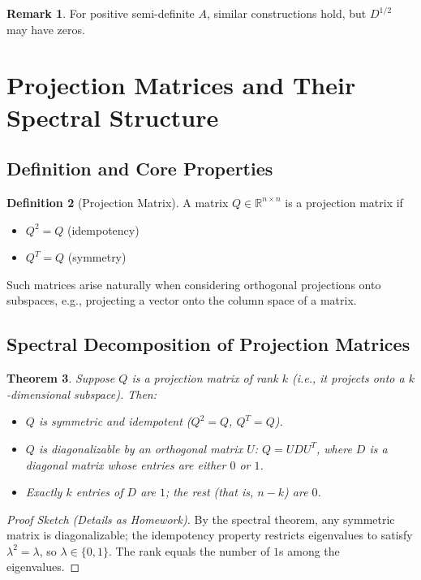 \documentclass[11pt]{article}
\theoremstyle{definition}
\newtheorem{definition}{Definition}[section]
\theoremstyle{plain}
\newtheorem{theorem}[definition]{Theorem}
\theoremstyle{definition}
\newtheorem{remark}[definition]{Remark}
\begin{document}
\begin{remark}
For positive semi-definite $A$, similar constructions hold, but $D^{1/2}$ may have zeros.
\end{remark}

\section{Projection Matrices and Their Spectral Structure}

\subsection{Definition and Core Properties}

\begin{definition}[Projection Matrix]
A matrix $Q \in \mathbb{R}^{n \times n}$ is a projection matrix if
\begin{itemize}
    \item $Q^2 = Q$ \hfill (idempotency)
    \item $Q^T = Q$ \hfill (symmetry)
\end{itemize}
\end{definition}

Such matrices arise naturally when considering orthogonal projections onto subspaces, e.g., projecting a vector onto the column space of a matrix.

\subsection{Spectral Decomposition of Projection Matrices}

\begin{theorem}
Suppose $Q$ is a projection matrix of rank $k$ (i.e., it projects onto a $k$-dimensional subspace). Then:
\begin{itemize}
    \item $Q$ is symmetric and idempotent ($Q^2 = Q$, $Q^T = Q$).
    \item $Q$ is diagonalizable by an orthogonal matrix $U$: $Q = U D U^T$, where $D$ is a diagonal matrix whose entries are either $0$ or $1$.
    \item Exactly $k$ entries of $D$ are $1$; the rest (that is, $n-k$) are $0$.
\end{itemize}
\end{theorem}

\begin{proof}[Proof Sketch (Details as Homework)]
By the spectral theorem, any symmetric matrix is diagonalizable; the idempotency property restricts eigenvalues to satisfy $\lambda^2 = \lambda$, so $\lambda \in \{0,1\}$. The rank equals the number of $1$s among the eigenvalues.
\end{proof}
\end{document}
